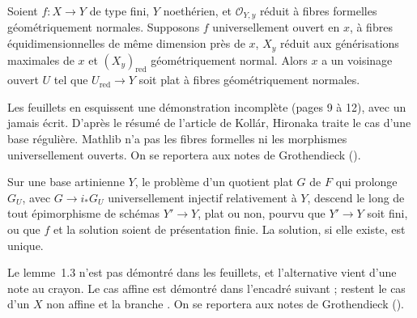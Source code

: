 \begin{encadre}
\begin{theoreme*}\nonverifie
Soient $f : X \to Y$ de type fini, $Y$ noethérien, et $\mathcal O_{Y,y}$ réduit à fibres formelles géométriquement normales. Supposons $f$ universellement ouvert en $x$, à fibres équidimensionnelles de même dimension près de $x$, $X_y$ réduit aux générisations maximales de $x$ et $(X_y)_{\mathrm{red}}$ géométriquement normal. Alors $x$ a un voisinage ouvert $U$ tel que $U_{\mathrm{red}} \to Y$ soit plat à fibres géométriquement normales.
\end{theoreme*}
\end{encadre}
{\small Les feuillets en esquissent une démonstration incomplète (pages 9 à 12), avec un  jamais écrit. D'après le résumé de l'article de Kollár, Hironaka traite le cas d'une base régulière. Mathlib n'a pas les fibres formelles ni les morphismes universellement ouverts. On se reportera aux notes de Grothendieck ().\par}

\begin{encadre}
\begin{theoreme*}\nonverifie
Sur une base artinienne $Y$, le problème d'un quotient plat $G$ de $F$ qui prolonge $G_U$, avec $G \to i_*G_U$ universellement injectif relativement à $Y$, descend le long de tout épimorphisme de schémas $Y' \to Y$, plat ou non, pourvu que $Y' \to Y$ soit fini, ou que $f$ et la solution soient de présentation finie. La solution, si elle existe, est unique.
\end{theoreme*}
\end{encadre}
{\small Le lemme~1.3 n'est pas démontré dans les feuillets, et l'alternative  vient d'une note au crayon. Le cas affine est démontré dans l'encadré suivant ; restent le cas d'un $X$ non affine et la branche . On se reportera aux notes de Grothendieck ().\par}

